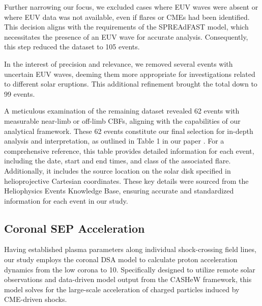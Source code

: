 Further narrowing our focus, we excluded cases where EUV waves were absent or where EUV data was not available, even if flares or CMEs had been identified. This decision aligns with the requirements of the SPREAdFAST model, which necessitates the presence of an EUV wave for accurate analysis. Consequently, this step reduced the dataset to 105 events.

In the interest of precision and relevance, we removed several events with uncertain EUV waves, deeming them more appropriate for investigations related to different solar eruptions. This additional refinement brought the total down to 99 events.

A meticulous examination of the remaining dataset revealed 62 events with measurable near-limb or off-limb CBFs, aligning with the capabilities of our analytical framework. These 62 events constitute our final selection for in-depth analysis and interpretation, as outlined in Table 1 in our paper \citep{kozarev_2022}.
For a comprehensive reference, this table provides detailed information for each event, including the date, start and end times, and class of the associated flare. Additionally, it includes the source location on the solar disk specified in helioprojective Cartesian coordinates. These key details were sourced from the Heliophysics Events Knowledge Base, ensuring accurate and standardized information for each event in our study.

\subsection{Coronal SEP Acceleration}
Having established plasma parameters along individual shock-crossing field lines, our study employs the coronal DSA model \citep{kozarev_2016, kozarev_2019} to calculate proton acceleration dynamics from the low corona to 10\rsun. Specifically designed to utilize remote solar observations and data-driven model output from the CASHeW framework, this model solves for the large-scale acceleration of charged particles induced by CME-driven shocks.

